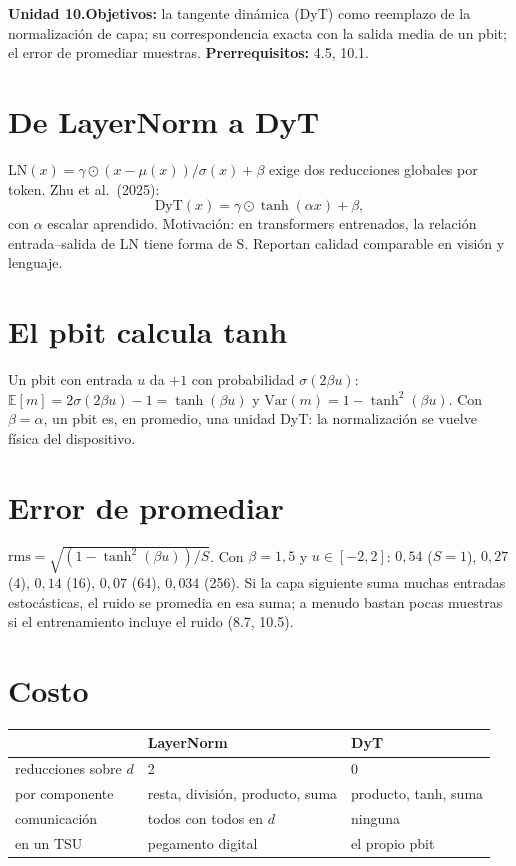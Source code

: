 \documentclass[11pt,a4paper]{article}
\begin{document}

\noindent\textbf{Unidad 10.}\quad\textbf{Objetivos:} la tangente dinámica (DyT) como reemplazo de la normalización de capa; su correspondencia exacta con la salida media de
un pbit; el error de promediar muestras.
\textbf{Prerrequisitos:} 4.5, 10.1.

\section{De LayerNorm a DyT}
$\mathrm{LN}(x)=\gamma\odot(x-\mu(x))/\sigma(x)+\beta$ exige dos reducciones globales por token. Zhu et al.\ (2025):
\[\mathrm{DyT}(x)=\gamma\odot\tanh(\alpha x)+\beta,\]
con $\alpha$ escalar aprendido. Motivación: en transformers entrenados, la relación entrada--salida de LN tiene forma de S. Reportan calidad comparable en visión y lenguaje.

\section{El pbit calcula tanh}
Un pbit con entrada $u$ da $+1$ con probabilidad $\sigma(2\beta u)$: $\mathbb E[m]=2\sigma(2\beta u)-1=\tanh(\beta u)$ y $\mathrm{Var}(m)=1-\tanh^2(\beta u)$. Con $\beta=\alpha$, un pbit es,
en promedio, una unidad DyT: la normalización se vuelve física del dispositivo.

\section{Error de promediar \evS}
$\mathrm{rms}=\sqrt{(1-\tanh^2(\beta u))/S}$. Con $\beta=1{,}5$ y $u\in[-2,2]$: $0{,}54$ ($S=1$), $0{,}27$ (4), $0{,}14$ (16), $0{,}07$ (64), $0{,}034$ (256). Si la capa siguiente
suma muchas entradas estocásticas, el ruido se promedia en esa suma; a menudo bastan pocas muestras si el entrenamiento incluye el ruido (8.7, 10.5).

\section{Costo}
\begin{center}\small\begin{tabular}{lll}\toprule
& LayerNorm & DyT\\\midrule
reducciones sobre $d$ & 2 & 0\\
por componente & resta, división, producto, suma & producto, tanh, suma\\
comunicación & todos con todos en $d$ & ninguna\\
en un TSU & pegamento digital & el propio pbit\\\bottomrule\end{tabular}\end{center}
\end{document}
